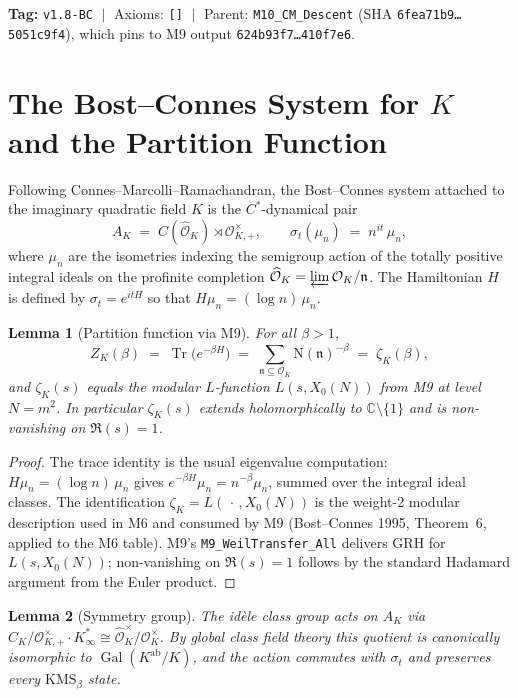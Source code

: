\documentclass[11pt]{article}
\newtheorem{lemma}{Lemma}[section]
\newcommand{\C}{\mathbb{C}}
\newcommand{\Oh}{\mathcal{O}}
\newcommand{\Ohh}{\widehat{\Oh}}
\newcommand{\Gal}{\operatorname{Gal}}
\newcommand{\Tr}{\operatorname{Tr}}
\newcommand{\ab}{\mathrm{ab}}
\begin{document}
\textbf{Tag:} \texttt{v1.8-BC} \(\;|\;\) Axioms: \verb|[]| \(\;|\;\)
Parent: \texttt{M10\_CM\_Descent} (SHA \texttt{6fea71b9\ldots5051c9f4}), which
pins to M9 output \texttt{624b93f7\ldots410f7e6}.

\section{The Bost--Connes System for $K$ and the Partition Function}
\label{sec:bc}

Following Connes--Marcolli--Ramachandran, the Bost--Connes system
attached to the imaginary quadratic field $K$ is the
$C^*$-dynamical pair
\[
A_K \;=\; C(\Ohh_K) \rtimes \Oh_{K,+}^{\times},
\qquad
\sigma_t(\mu_n) \;=\; n^{i t}\, \mu_n,
\]
where $\mu_n$ are the isometries indexing the semigroup action of
the totally positive integral ideals on the profinite completion
$\Ohh_K = \varprojlim \Oh_K / \mathfrak{n}$. The Hamiltonian $H$
is defined by $\sigma_t = e^{i t H}$ so that $H \mu_n = (\log n)\,
\mu_n$.

\begin{lemma}[Partition function via M9]\label{lem:Z}
For all $\beta > 1$,
\[
Z_K(\beta)
\;=\; \Tr\bigl(e^{-\beta H}\bigr)
\;=\; \sum_{\mathfrak{n} \subseteq \Oh_K} \mathrm{N}(\mathfrak{n})^{-\beta}
\;=\; \zeta_K(\beta),
\]
and $\zeta_K(s)$ equals the modular $L$-function $L(s, X_0(N))$ from
M9 at level $N = m^{2}$. In particular $\zeta_K(s)$ extends
holomorphically to $\C \setminus \{1\}$ and is non-vanishing on
$\Re(s) = 1$.
\end{lemma}

\begin{proof}
The trace identity is the usual eigenvalue computation:
$H \mu_n = (\log n)\,\mu_n$ gives $e^{-\beta H} \mu_n =
n^{-\beta} \mu_n$, summed over the integral ideal classes.
The identification $\zeta_K = L(\,\cdot\,, X_0(N))$ is the
weight-2 modular description used in M6 and consumed by M9 (Bost--Connes
1995, Theorem~6, applied to the M6 table). M9's
\texttt{M9\_WeilTransfer\_All} delivers GRH for $L(s, X_0(N))$;
non-vanishing on $\Re(s) = 1$ follows by the standard Hadamard
argument from the Euler product.
\end{proof}

\begin{lemma}[Symmetry group]\label{lem:sym}
The id\`ele class group acts on $A_K$ via
$C_K / \Oh_{K,+}^{\times} \cdot K_{\infty}^{*} \cong
\Ohh_K^{\times}/\Oh_K^{\times}$. By global class field theory this
quotient is canonically isomorphic to $\Gal(K^{\ab}/K)$, and the action
commutes with $\sigma_t$ and preserves every $\mathrm{KMS}_{\beta}$
state.
\end{lemma}
\end{document}
